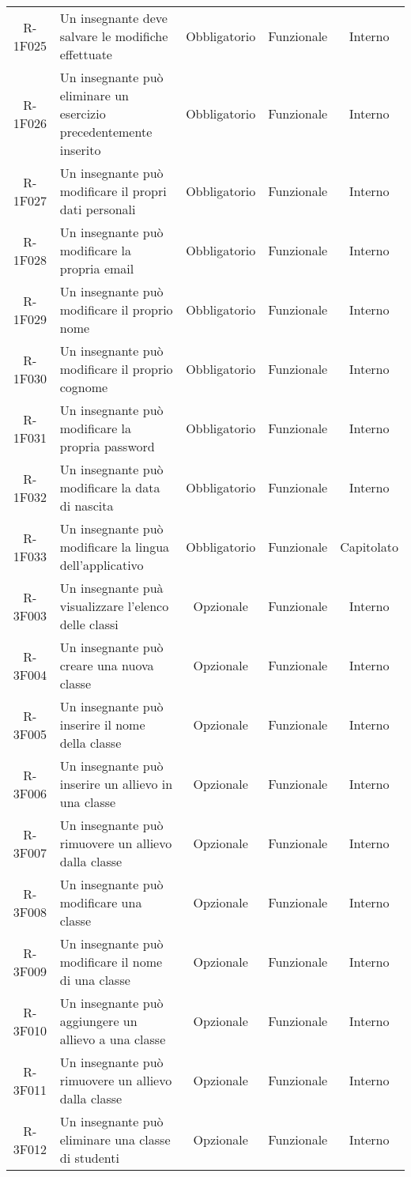 \begin{tabularx}{\textwidth}{cXccc}
		R-1F025 & Un insegnante deve salvare le modifiche effettuate & Obbligatorio & Funzionale & Interno \\
		R-1F026 & Un insegnante può eliminare un esercizio precedentemente inserito & Obbligatorio & Funzionale & Interno \\
		R-1F027 & Un insegnante può modificare il propri dati personali & Obbligatorio & Funzionale & Interno \\
		R-1F028 & Un insegnante può modificare la propria email & Obbligatorio & Funzionale & Interno \\
		R-1F029 & Un insegnante può modificare il proprio nome & Obbligatorio & Funzionale & Interno \\
		R-1F030 & Un insegnante può modificare il proprio cognome & Obbligatorio & Funzionale & Interno \\
		R-1F031 & Un insegnante può modificare la propria password & Obbligatorio & Funzionale & Interno \\
		R-1F032 & Un insegnante può modificare la data di nascita & Obbligatorio & Funzionale & Interno \\
		R-1F033 & Un insegnante può modificare la lingua dell'applicativo & Obbligatorio & Funzionale & Capitolato \\
		R-3F003 & Un insegnante puà visualizzare l'elenco delle classi & Opzionale & Funzionale & Interno \\
		R-3F004 & Un insegnante può creare una nuova classe & Opzionale & Funzionale & Interno \\
		R-3F005 & Un insegnante può inserire il nome della classe & Opzionale & Funzionale & Interno \\
		R-3F006 & Un insegnante può inserire un allievo in una classe & Opzionale & Funzionale & Interno \\
		R-3F007 & Un insegnante può rimuovere un allievo dalla classe & Opzionale & Funzionale & Interno \\
		R-3F008 & Un insegnante può modificare una classe & Opzionale & Funzionale & Interno \\
		R-3F009 & Un insegnante può modificare il nome di una classe & Opzionale & Funzionale & Interno \\
		R-3F010 & Un insegnante può aggiungere un allievo a una classe & Opzionale & Funzionale & Interno \\
		R-3F011 & Un insegnante può rimuovere un allievo dalla classe & Opzionale & Funzionale & Interno \\
		R-3F012 & Un insegnante può eliminare una classe di studenti & Opzionale & Funzionale & Interno \\

\end{tabularx}
